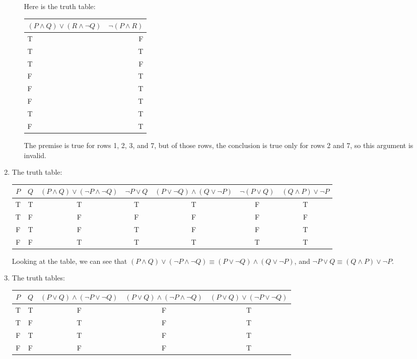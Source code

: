 \documentclass{article}
\begin{document}
\begin{enumerate}
\begin{enumerate}
    Here is the truth table:

    \begin{tabular}{l r}
      $(P \land Q) \lor (R \land \lnot Q)$ & $\lnot (P \land R)$ \\ \hline
      T & F \\
      T & T \\
      T & F \\
      F & T \\
      F & T \\
      F & T \\
      T & T \\
      F & T \\
    \end{tabular}

    The premise is true for rows 1, 2, 3, and 7, but of those rows, the conclusion is true only for rows 2 and 7, so this argument is invalid.
  \end{enumerate}
\item
  The truth table:

  \begin{tabular}{c c c c c c c}
    $P$ & $Q$ & $(P \land Q) \lor (\lnot P \land \lnot Q)$ & $\lnot P \lor Q$ & $(P \lor \lnot Q) \land (Q \lor \lnot P)$ & $\lnot(P \lor Q)$ & $(Q \land P) \lor \lnot P$ \\ \hline
    T & T & T & T & T & F & T \\
    T & F & F & F & F & F & F \\
    F & T & F & T & F & F & T \\
    F & F & T & T & T & T & T \\
  \end{tabular}

  Looking at the table, we can see that $(P \land Q) \lor (\lnot P \land \lnot Q) \equiv (P \lor \lnot Q) \land (Q \lor \lnot P)$, and $\lnot P \lor Q \equiv (Q \land P) \lor \lnot P$.
\item
  The truth tables:

  \begin{tabular}{c c c c c}
    $P$ & $Q$ & $(P \lor Q) \land (\lnot P \lor \lnot Q)$ & $(P \lor Q) \land (\lnot P \land \lnot Q)$ & $(P \lor Q) \lor (\lnot P \lor \lnot Q)$ \\ \hline
    T & T & F & F & T \\
    T & F & T & F & T \\
    F & T & T & F & T \\
    F & F & F & F & T \\
  \end{tabular}


\end{enumerate}
\end{document}

